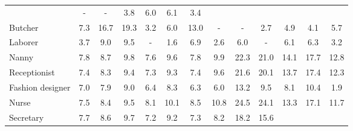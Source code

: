 \begin{table*}[p]
{\begin{tabular}{l|ccc|ccc|ccc|ccc}
& \cellcolor{lightgray} - & \cellcolor{lightgray} - & \cellcolor{blue1} 3.8
& \cellcolor{orange2} 6.0 & \cellcolor{orange2} 6.1 & \cellcolor{blue1} 3.4
\\
Butcher
& \cellcolor{blue3} 7.3 & \cellcolor{blue6} 16.7 & \cellcolor{blue7} 19.3
& \cellcolor{blue1} 3.2 & \cellcolor{blue2} 6.0 & \cellcolor{blue5} 13.0
& \cellcolor{lightgray} - & \cellcolor{lightgray} - & \cellcolor{blue1} 2.7
& \cellcolor{orange2} 4.9 & \cellcolor{orange2} 4.1 & \cellcolor{blue2} 5.7
\\
Laborer
& \cellcolor{blue1} 3.7 & \cellcolor{blue3} 9.0 & \cellcolor{blue4} 9.5
& \cellcolor{lightgray} - & \cellcolor{blue1} 1.6 & \cellcolor{blue3} 6.9
& \cellcolor{orange1} 2.6 & \cellcolor{orange2} 6.0 & \cellcolor{lightgray} -
& \cellcolor{orange2} 6.1 & \cellcolor{orange2} 6.3 & \cellcolor{blue1} 3.2
\\
Nanny
& \cellcolor{orange3} 7.8 & \cellcolor{orange3} 8.7 & \cellcolor{orange4} 9.8
& \cellcolor{orange3} 7.6 & \cellcolor{orange4} 9.6 & \cellcolor{orange3} 7.8
& \cellcolor{orange4} 9.9 & \cellcolor{orange8} 22.3 & \cellcolor{orange8} 21.0
& \cellcolor{orange5} 14.1 & \cellcolor{orange7} 17.7 & \cellcolor{orange5} 12.8
\\
Receptionist
& \cellcolor{orange3} 7.4 & \cellcolor{orange3} 8.3 & \cellcolor{orange4} 9.4
& \cellcolor{orange3} 7.3 & \cellcolor{orange4} 9.3 & \cellcolor{orange3} 7.4
& \cellcolor{orange4} 9.6 & \cellcolor{orange8} 21.6 & \cellcolor{orange8} 20.1
& \cellcolor{orange5} 13.7 & \cellcolor{orange7} 17.4 & \cellcolor{orange5} 12.3
\\
Fashion designer
& \cellcolor{orange3} 7.0 & \cellcolor{orange3} 7.9 & \cellcolor{orange3} 9.0
& \cellcolor{orange2} 6.4 & \cellcolor{orange3} 8.3 & \cellcolor{orange2} 6.3
& \cellcolor{orange2} 6.0 & \cellcolor{orange5} 13.2 & \cellcolor{orange4} 9.5
& \cellcolor{orange3} 8.1 & \cellcolor{orange4} 10.4 & \cellcolor{orange1} 1.9
\\
Nurse
& \cellcolor{orange3} 7.5 & \cellcolor{orange3} 8.4 & \cellcolor{orange4} 9.5
& \cellcolor{orange3} 8.1 & \cellcolor{orange4} 10.1 & \cellcolor{orange3} 8.5
& \cellcolor{orange4} 10.8 & \cellcolor{orange9} 24.5 & \cellcolor{orange9} 24.1
& \cellcolor{orange5} 13.3 & \cellcolor{orange6} 17.1 & \cellcolor{orange4} 11.7
\\
Secretary
& \cellcolor{orange3} 7.7 & \cellcolor{orange3} 8.6 & \cellcolor{orange4} 9.7
& \cellcolor{orange3} 7.2 & \cellcolor{orange4} 9.2 & \cellcolor{orange3} 7.3
& \cellcolor{orange3} 8.2 & \cellcolor{orange7} 18.2 & \cellcolor{orange6} 15.6

\end{tabular}}
\end{table*}
